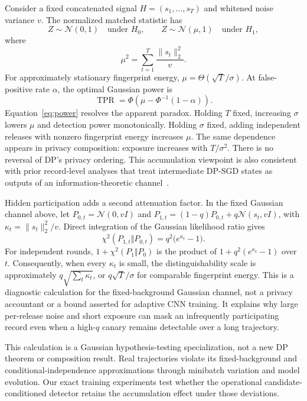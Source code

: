 \documentclass[conference]{IEEEtran}
\newcommand{\Normal}{\mathcal{N}}
\begin{document}
Consider a fixed concatenated signal $H=(s_1,\ldots,s_T)$ and whitened noise variance $v$. The normalized matched statistic has
\begin{equation}
Z\sim\Normal(0,1)\quad\text{under }H_0,
\qquad
Z\sim\Normal(\mu,1)\quad\text{under }H_1,
\end{equation}
where
\begin{equation}
\mu^2=\sum_{t=1}^{T}\frac{\lVert s_t\rVert_2^2}{v}.
\label{eq:mu}
\end{equation}
For approximately stationary fingerprint energy, $\mu=\Theta(\sqrt{T}/\sigma)$. At false-positive rate $\alpha$, the optimal Gaussian power is
\begin{equation}
\operatorname{TPR}=\Phi\left(\mu-\Phi^{-1}(1-\alpha)\right).
\label{eq:power}
\end{equation}
Equation~\ref{eq:power} resolves the apparent paradox. Holding $T$ fixed, increasing $\sigma$ lowers $\mu$ and detection power monotonically. Holding $\sigma$ fixed, adding independent releases with nonzero fingerprint energy increases $\mu$. The same dependence appears in privacy composition: exposure increases with $T/\sigma^2$. There is no reversal of DP's privacy ordering. This accumulation viewpoint is also consistent with prior record-level analyses that treat intermediate DP-SGD states as outputs of an information-theoretic channel~\cite{cherubin2024closed}.

Hidden participation adds a second attenuation factor. In the fixed Gaussian
channel above, let $P_{0,t}=\Normal(0,vI)$ and
$P_{1,t}=(1-q)P_{0,t}+q\Normal(s_t,vI)$, with
$\kappa_t=\lVert s_t\rVert_2^2/v$. Direct integration of the Gaussian
likelihood ratio gives
\begin{equation}
\chi^2(P_{1,t}\Vert P_{0,t})=q^2\bigl(e^{\kappa_t}-1\bigr).
\label{eq:participation-chi2}
\end{equation}
For independent rounds, $1+\chi^2(P_1\Vert P_0)$ is the product of
$1+q^2(e^{\kappa_t}-1)$ over $t$. Consequently, when every $\kappa_t$ is
small, the distinguishability scale is approximately
$q\sqrt{\sum_t\kappa_t}$, or $q\sqrt{T}/\sigma$ for comparable
fingerprint energy. This is a diagnostic calculation for the fixed-background
Gaussian channel, not a privacy accountant or a bound asserted for adaptive
CNN training. It explains why large per-release noise and short exposure can
mask an infrequently participating record even when a high-$q$ canary remains
detectable over a long trajectory.

This calculation is a Gaussian hypothesis-testing specialization, not a new DP theorem or composition result. Real trajectories violate its fixed-background and conditional-independence approximations through minibatch variation and model evolution. Our exact training experiments test whether the operational candidate-conditioned detector retains the accumulation effect under those deviations.
\end{document}
